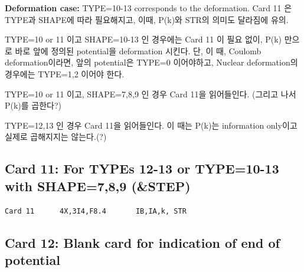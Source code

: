 \documentclass[11pt]{book}
\begin{document}
{\bf Deformation case:} TYPE=10-13 corresponds to the deformation. 
Card 11 은 TYPE과 SHAPE에 따라 필요해지고, 이때, P(k)와 STR의 의미도 달라짐에 유의. 

TYPE=10 or 11 이고 SHAPE=10-13 인 경우에는 Card 11 이 필요 없이, P(k) 만으로 
바로 앞에 정의된 potential을 deformation 시킨다. 단, 이 때, Coulomb deformation이라면,
앞의 potential은 TYPE=0 이어야하고, Nuclear deformation의 경우에는 
TYPE=1,2 이어야 한다. 

TYPE=10 or 11 이고, SHAPE=7,8,9 인 경우 Card 11을 읽어들인다. (그리고 나서 P(k)를 곱한다?)

TYPE=12,13 인 경우 Card 11을 읽어들인다. 이 때는 P(k)는 information only이고 실제로 곱해지지는 
않는다.(?) 


\subsection{Card 11: For TYPEs 12-13 or TYPE=10-13 with SHAPE=7,8,9 (\&STEP) }
\begin{verbatim}
Card 11      4X,3I4,F8.4       IB,IA,k, STR
\end{verbatim}

\subsection{Card 12: Blank card for indication of end of potential}
\end{document}
